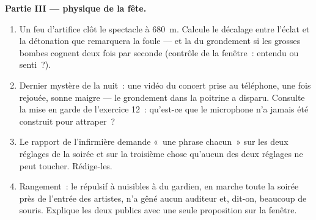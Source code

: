 \begin{problem}
\medskip\noindent\textbf{Partie III --- physique de la fête.}
\begin{enumerate}[resume]
  \item Un feu d'artifice clôt le spectacle à \qty{680}{m}. Calcule
        le décalage entre l'éclat et la détonation que remarquera
        la foule --- et la  du grondement si les grosses
        bombes cognent deux fois par seconde (contrôle de la
        fenêtre~: entendu ou senti~?).
  \item Dernier mystère de la nuit~: une vidéo du concert prise au
        téléphone, une fois rejouée, sonne maigre --- le grondement
        dans la poitrine a disparu. Consulte la mise en garde de
        l'exercice 12~: qu'est-ce que le microphone n'a jamais été
        construit pour attraper~?
  \item Le rapport de l'infirmière demande «~une phrase chacun~»
        sur les deux réglages de la soirée et sur la troisième
        chose qu'aucun des deux réglages ne peut toucher.
        Rédige-les.
  \item Rangement~: le répulsif à nuisibles à  du
        gardien, en marche toute la soirée près de l'entrée des
        artistes, n'a gêné aucun auditeur et, dit-on, beaucoup de
        souris. Explique les deux publics avec une seule
        proposition sur la fenêtre.
\end{enumerate}
\end{problem}
